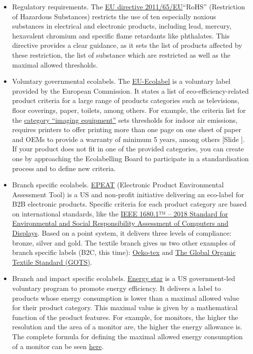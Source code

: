 \documentclass{article}
\newcounter{slide}
\begin{document}
\begin{itemize}
	\item Regulatory requirements. The \href{https://eur-lex.europa.eu/legal-content/EN/TXT/?qid=1399998664957&uri=CELEX:02011L0065-20140129}{EU directive 2011/65/EU}``RoHS'' (Restriction of Hazardous Substances) restricts the use of ten especially noxious substances in electrical and electronic products, including lead, mercury, hexavalent chromium and specific flame retardants like phthalates. This directive provides a clear guidance, as it sets the list of products affected by these restriction, the list of substance which are restricted as well as the maximal allowed thresholds.
	\item Voluntary governmental ecolabels. The \href{http://ec.europa.eu/environment/ecolabel/}{EU-Ecolabel} is a voluntary label provided by the European Commission. It states a list of eco-efficiency-related product criteria for a large range of products categories such as televisions, floor coverings, paper, toilets, among others. For example, the criteria list for the \href{https://eur-lex.europa.eu/LexUriServ/LexUriServ.do?uri=OJ:L:2013:353:0053:0063:EN:PDF}{category ``imaging equipment''} sets thresholds for indoor air emissions, requires printers to offer printing more than one page on one sheet of paper and OEMs to provide a warranty of minimum 5 years, among others {\color{blue}[Slide ]}. If your product does not fit in one of the provided categories, you can create one by approaching the Ecolabelling Board to participate in a standardisation process and to define new criteria. 
	\item Branch specific ecolabels. \href{http://greenelectronicscouncil.org/epeat/epeat-overview/}{EPEAT} (Electronic Product Environmental Assessment Tool) is a US and non-profit initiative delivering an eco-label for B2B electronic products. Specific criteria for each product category are based on international standards, like the \href{https://ieeexplore.ieee.org/document/8320570/}{IEEE 1680.1™ – 2018 Standard for Environmental and Social Responsibility Assessment of Computers and Displays}. Based on a point system, it delivers three levels of compliance: bronze, silver and gold. The textile branch gives us two other examples of branch specific labels (B2C, this time): \href{https://www.oeko-tex.com/}{Oeko-tex} and \href{https://www.global-standard.org/}{The Global Organic Textile Standard (GOTS)}.
	\item Branch and impact specific ecolabels. \href{https://www.energystar.gov/}{Energy star} is a US government-led voluntary program to promote energy efficiency. It delivers a label to products whose energy consumption is lower than a maximal allowed value for their product category. This maximal value is given by a mathematical function of the product features. For example, for monitors, the higher the resolution and the area of a monitor are, the higher the energy allowance is. The complete formula for defining the maximal allowed energy consumption of a monitor can be seen \href{https://www.energystar.gov/products/office_equipment/displays/displays_key_product_criteria}{here}.
\end{itemize}
\end{document}
